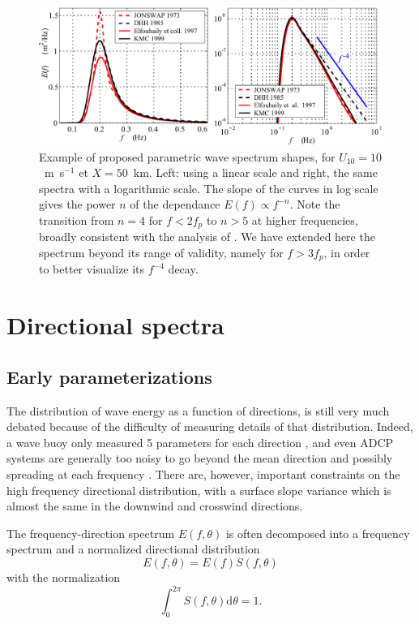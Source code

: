\begin{figure}[htb]
\centerline{\includegraphics[width=\textwidth]{FIGS_CH_FETCH/Spec_comp50km_linlog_en.pdf}}
  \caption{Example of proposed parametric wave spectrum shapes, for $U_{10}=10$~m~s$^{-1}$ et $X=50$~km. Left: using a linear scale and 
right, the same spectra with a logarithmic scale. The slope of the curves in log scale gives the power  $n$ of the 
  dependance  $E(f) \propto f^{-n}$. Note the transition from
  $n=4$ for $f< 2 f_p$ to $n>5$ at higher frequencies, broadly consistent with the analysis of \cite{Long&Resio2007}. 
  We have extended here the \cite{Donelan&al.1985} spectrum beyond its range of validity, namely for $f>3 f_p$, in order 
to better visualize its  $f^{-4}$ decay.}
\label{spectra_comp}
\end{figure}

\section{Directional spectra} 
\subsection{Early parameterizations}
The distribution of wave energy as a function of directions, is still very much debated because of the 
difficulty of measuring details of that distribution. Indeed, a wave buoy only measured 5 parameters for each direction \citep[e.g.][]{Kuik&al.1988}, and even 
ADCP systems are generally too noisy to go beyond the mean direction and possibly spreading at each frequency \citep{Herbers&Lentz2010}. 
There are, however, important constraints on the high frequency directional distribution, with a surface slope variance which is almost the same in the downwind and 
crosswind directions. 

The frequency-direction spectrum $E(f,\theta)$ is often decomposed into a frequency spectrum and a 
normalized directional distribution 
\begin{equation}
   E(f,\theta)=E(f)S(f,\theta)
\end{equation}
with the normalization
\begin{equation}
   \int_0^{2\pi} S(f,\theta) {\mathrm d}\theta=1.
\end{equation}

